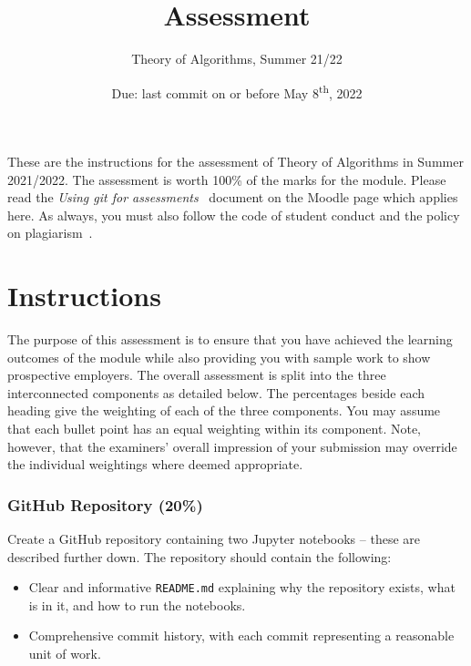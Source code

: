 \documentclass[a4paper, 12pt]{scrartcl}
\title{\vspace{-20mm}Assessment}
\author{Theory of Algorithms, Summer 21/22}
\date{Due: last commit on or before May 8\textsuperscript{th}, 2022\vspace{-6mm}}
\begin{document}
  
  \maketitle

  These are the instructions for the assessment of Theory of Algorithms in Summer 2021/2022.
  The assessment is worth 100\% of the marks for the module.
  Please read the \emph{Using git for assessments}~\cite{usinggit} document on the Moodle page which applies here.
  As always, you must also follow the code of student conduct and the policy on plagiarism~\cite{gmitqaf}.

  \section*{Instructions}
  
  The purpose of this assessment is to ensure that you have achieved the learning outcomes of the module while also providing you with sample work to show prospective employers.
  The overall assessment is split into the three interconnected components as detailed below.
  The percentages beside each heading give the weighting of each of the three components.
  You may assume that each bullet point has an equal weighting within its component.
  Note, however, that the examiners' overall impression of your submission may override the individual weightings where deemed appropriate.

  \subsubsection*{GitHub Repository (20\%)}
  Create a GitHub repository containing two Jupyter notebooks -- these are described further down.
  The repository should contain the following:
  \begin{itemize}
    \item Clear and informative \texttt{README.md} explaining why the repository exists, what is in it, and how to run the notebooks.
    \item Comprehensive commit history, with each commit representing a reasonable unit of work.
  \end{itemize}
\end{document}

